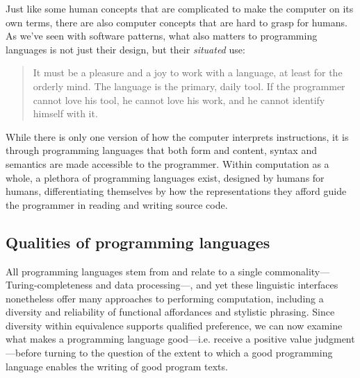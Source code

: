 Just like some human concepts that are complicated to make the computer on its own terms, there are also computer concepts that are hard to grasp for humans. As we've seen with software patterns, what also matters to programming languages is not just their design, but their \emph{situated} use:

\begin{quote}
  It must be a pleasure and a joy to work with a language, at least for the orderly mind. The language is the primary, daily tool. If the programmer cannot love his tool, he cannot love his work, and he cannot identify himself with it. \citep{wirth_essence_2003}
\end{quote}

While there is only one version of how the computer interprets instructions, it is through programming languages that both form and content, syntax and semantics are made accessible to the programmer. Within computation as a whole, a plethora of programming languages exist, designed by humans for humans, differentiating themselves by how the representations they afford guide the programmer in reading and writing source code.

\subsection{Qualities of programming languages}
\label{subsec:qualities-programming-languages}

All programming languages stem from and relate to a single commonality—Turing-completeness and data processing—, and yet these linguistic interfaces nonetheless offer many approaches to performing computation, including a diversity and reliability of functional affordances and stylistic phrasing. Since diversity within equivalence supports qualified preference, we can now examine what makes a programming language good—i.e. receive a positive value judgment—before turning to the question of the extent to which a good programming language enables the writing of good program texts.

